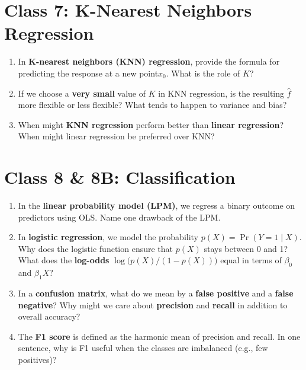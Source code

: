 \documentclass[11pt]{article}
\begin{document}
\section*{Class 7: K-Nearest Neighbors Regression}

\begin{enumerate}[leftmargin=*, resume]

\item In \textbf{K-nearest neighbors (KNN) regression}, provide the formula for predicting the response at a new point$x_0$. What is the role of $K$?

\item If we choose a \textbf{very small} value of $K$ in KNN regression, is the resulting $\hat{f}$ more flexible or less flexible? What tends to happen to variance and bias?

\item When might \textbf{KNN regression} perform better than \textbf{linear regression}? When might linear regression be preferred over KNN?

\end{enumerate}

\section*{Class 8 \& 8B: Classification}

\begin{enumerate}[leftmargin=*, resume]

\item In the \textbf{linear probability model (LPM)}, we regress a binary outcome on predictors using OLS. Name one drawback of the LPM. 

\item In \textbf{logistic regression}, we model the probability $p(X) = \Pr(Y=1 \mid X)$. Why does the logistic function ensure that $p(X)$ stays between 0 and 1? What does the \textbf{log-odds} $\log\bigl(p(X)/(1-p(X))\bigr)$ equal in terms of $\beta_0$ and $\beta_1 X$?

\item In a \textbf{confusion matrix}, what do we mean by a \textbf{false positive} and a \textbf{false negative}? Why might we care about \textbf{precision} and \textbf{recall} in addition to overall accuracy?

\item The \textbf{F1 score} is defined as the harmonic mean of precision and recall. In one sentence, why is F1 useful when the classes are imbalanced (e.g., few positives)?

\end{enumerate}
\end{document}
